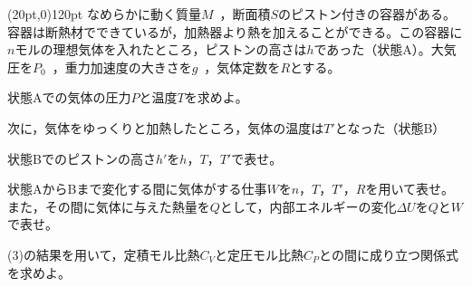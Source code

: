 \hakosyokika
\item
    \begin{mawarikomi}(20pt,0){120pt}{}
        なめらかに動く質量$M$~，断面積$S$のピストン付きの容器がある。容器は断熱材でできているが，加熱器より熱を加えることができる。この容器に$n$モルの理想気体を入れたところ，ピストンの高さは$h$であった（状態A）。大気圧を$P_0$~，重力加速度の大きさを$g$~，気体定数を$R$とする。
        \begin{Enumerate}
            \item 状態Aでの気体の圧力$P$と温度$T$を求めよ。
        \end{Enumerate}
        次に，気体をゆっくりと加熱したところ，気体の温度は$T'$となった（状態B）
        \begin{Enumerate*}
            \item 状態Bでのピストンの高さ$h'$を$h$，$T$，$T'$で表せ。
            \item 状態AからBまで変化する間に気体がする仕事$W$を$n$，$T$，$T'$，$R$を用いて表せ。また，その間に気体に与えた熱量を$Q$として，内部エネルギーの変化$\varDelta U$を$Q$と$W$で表せ。
            \item (3)の結果を用いて，定積モル比熱$C_V $と定圧モル比熱$C_P$との間に成り立つ関係式を求めよ。
        \end{Enumerate*}
    \end{mawarikomi}